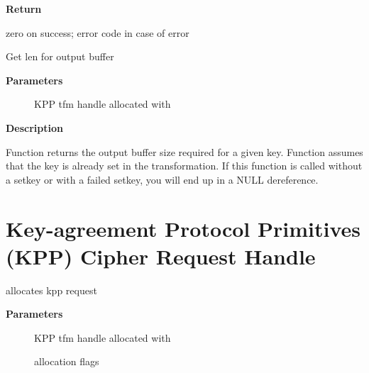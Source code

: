 \documentclass[a4paper,8pt,english]{sphinxmanual}
\begin{document}
\textbf{Return}

zero on success; error code in case of error

\begin{fulllineitems}
\label{crypto/api-kpp:c.crypto_kpp_maxsize}
Get len for output buffer

\end{fulllineitems}


\textbf{Parameters}
\begin{description}
\item[{}] \leavevmode
KPP tfm handle allocated with {\hyperref[crypto/api\string-kpp:c.crypto_alloc_kpp]{\emph{}}}

\end{description}

\textbf{Description}

Function returns the output buffer size required for a given key.
Function assumes that the key is already set in the transformation. If this
function is called without a setkey or with a failed setkey, you will end up
in a NULL dereference.


\section{Key-agreement Protocol Primitives (KPP) Cipher Request Handle}
\label{crypto/api-kpp:key-agreement-protocol-primitives-kpp-cipher-request-handle}

\begin{fulllineitems}
\label{crypto/api-kpp:c.kpp_request_alloc}
allocates kpp request

\end{fulllineitems}


\textbf{Parameters}
\begin{description}
\item[{}] \leavevmode
KPP tfm handle allocated with {\hyperref[crypto/api\string-kpp:c.crypto_alloc_kpp]{\emph{}}}

\item[{}] \leavevmode
allocation flags

\end{description}
\end{document}
